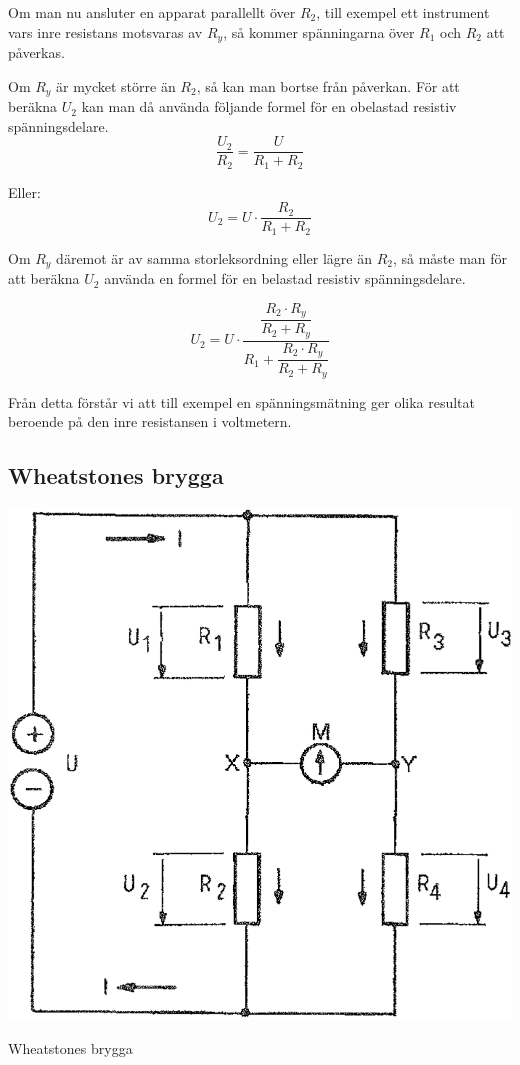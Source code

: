 Om man nu ansluter en apparat parallellt över \(R_2\), till exempel ett instrument
vars inre resistans motsvaras av \(R_y\), så kommer spänningarna över \(R_1\)
och \(R_2\) att påverkas.

Om \(R_y\) är mycket större än \(R_2\), så kan man bortse från påverkan.
För att beräkna \(U_2\) kan man då använda följande formel för en obelastad
resistiv spänningsdelare.
\[  \frac{U_2}{R_2} = \frac{U}{R_1 + R_2} \]

Eller:
\[  U_2 = U \cdot \frac{R_2}{R_1 + R_2} \]

Om \(R_y\) däremot är av samma storleksordning eller lägre än \(R_2\), så måste
man för att beräkna \(U_2\) använda en formel för en belastad resistiv
spänningsdelare.

\[
U_2 = U \cdot \dfrac{ \dfrac{R_2 \cdot R_y}{R_2 + R_y} }{ R_1 + \dfrac{R_2 \cdot R_y}{R_2 + R_y} }
\]

Från detta förstår vi att till exempel en spänningsmätning ger olika resultat beroende
på den inre resistansen i voltmetern.

\subsection{Wheatstones brygga}

\begin{marginfigure}%
  \includegraphics[width=\textwidth]{images/cropped_pdfs/bild_2_3-04.pdf}
  \caption{Wheatstones brygga}
  \label{fig:BildII3-04}
\end{marginfigure}

